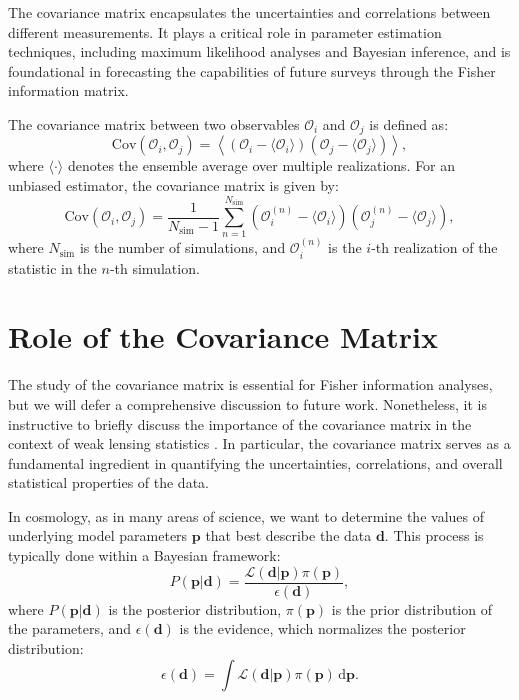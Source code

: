 The covariance matrix encapsulates the uncertainties and correlations between different measurements. It plays a critical role in parameter estimation techniques, including maximum likelihood analyses and Bayesian inference, and is foundational in forecasting the capabilities of future surveys through the Fisher information matrix.

The covariance matrix between two observables $\mathcal{O}_i$ and $\mathcal{O}_j$ is defined as:
\begin{equation}
    \mathrm{Cov}(\mathcal{O}_i, \mathcal{O}_j) = \left\langle (\mathcal{O}_i - \langle \mathcal{O}_i \rangle)(\mathcal{O}_j - \langle \mathcal{O}_j \rangle) \right\rangle,
\end{equation}
where $\langle \cdot \rangle$ denotes the ensemble average over multiple realizations.
For an unbiased estimator, the covariance matrix is given by:
\begin{equation}
    \label{eq:covariance}
    \mathrm{Cov}(\mathcal{O}_i, \mathcal{O}_j) = \frac{1}{N_{\mathrm{sim}} - 1} \sum_{n=1}^{N_{\mathrm{sim}}} (\mathcal{O}_i^{(n)} - \langle \mathcal{O}_i \rangle) (\mathcal{O}_j^{(n)} - \langle \mathcal{O}_j \rangle),
\end{equation}
where \( N_{\mathrm{sim}} \) is the number of simulations, and \( \mathcal{O}_i^{(n)} \) is the \( i \)-th realization of the statistic in the \( n \)-th simulation.

\section{Role of the Covariance Matrix}
The study of the covariance matrix is essential for Fisher information analyses, but we will defer a comprehensive discussion to future work. Nonetheless, it is instructive to briefly discuss the importance of the covariance matrix in the context of weak lensing statistics \citep{2004MNRAS.348..897T, 2005A&A...442...69K}. In particular, the covariance matrix serves as a fundamental ingredient in quantifying the uncertainties, correlations, and overall statistical properties of the data.

In cosmology, as in many areas of science, we want to determine the values of underlying model parameters $\mathbf{p}$ that best describe the data $\mathbf{d}$. This process is typically done within a Bayesian framework:
\begin{equation}
    P(\mathbf{p} | \mathbf{d}) = \frac{\mathcal{L}(\mathbf{d} | \mathbf{p}) \pi(\mathbf{p})}{\mathbf{\mathcal{\epsilon}}(\mathbf{d})},
\end{equation}
where $P(\mathbf{p} | \mathbf{d})$ is the posterior distribution, $\pi(\mathbf{p})$ is the prior distribution of the parameters, and $\mathbf{\mathcal{\epsilon}}(\mathbf{d})$ is the evidence, which normalizes the posterior distribution:
\begin{equation}
    \mathbf{\mathcal{\epsilon}}(\mathbf{d}) = \int \mathcal{L}(\mathbf{d} | \mathbf{p}) \pi(\mathbf{p}) \, \mathrm{d} \mathbf{p}.
\end{equation}

